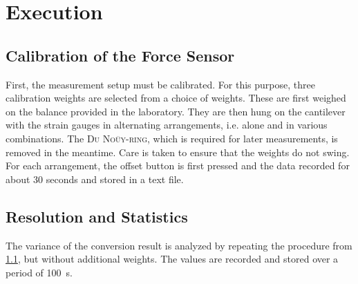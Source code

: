 \chapter{Execution}
\section{Calibration of the Force Sensor} \label{sec:Calibration}
First, the measurement setup must be calibrated. For this purpose, three calibration weights are selected from a choice of weights. These are first weighed on the balance provided in the laboratory. They are then hung on the cantilever with the strain gauges in alternating arrangements, i.e. alone and in various combinations. The \textsc{Du Noüy-ring}, which is required for later measurements, is removed in the meantime. Care is taken to ensure that the weights do not swing. For each arrangement, the offset button is first pressed and the data recorded for about 30 seconds and stored in a text file.
%
\section{Resolution and Statistics} \label{sec:Statistics}
The variance of the conversion result is analyzed by repeating the procedure from \cref{sec:Calibration}, but without additional weights. The values are recorded and stored over a period of \SI{100}{s}.
%
